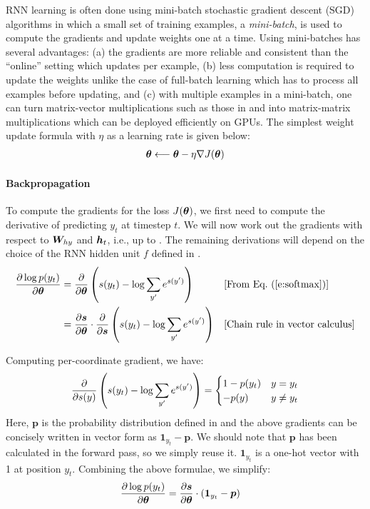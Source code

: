 RNN learning is often done using mini-batch stochastic gradient descent (SGD) algorithms in
which a small set of training examples, a {\it mini-batch}, is used to compute
the gradients and update weights one at a time. Using mini-batches has
several advantages: (a) the gradients are more reliable and consistent than the
``online'' setting which updates per example, (b) less computation is required to
update the weights unlike the case of full-batch learning which has to process
all examples before updating, and (c) with multiple examples in a mini-batch,
one can turn matrix-vector multiplications such
as those in  and  into matrix-matrix multiplications which can be
deployed efficiently on GPUs. The simplest weight update formula with $\eta$ as
a learning rate is given below:
\begin{align}
\thetav \longleftarrow \thetav - \eta \grad{J(\thetav)} %
\end{align}

\paragraph{Backpropagation} To compute the gradients for the loss $J(\bm{\theta})$,
we first need to compute the derivative of predicting $y_t$ at timestep $t$. We
will now work out the gradients with respect to $\bm{W}_{hy}$ and $\bm{h}_{t}$, i.e., up
to . The remaining derivations will depend on the choice of the RNN
hidden unit $f$ defined in .
\begin{align*}
\fracder{\log p(y_t)}{\thetav} &= \parfrac{\thetav} \paren{s(y_t) - \log \sum_{y'}
e^{s(y')}} && \text{[From \eq{e:softmax}]} \\
&= \fracder{\bm{s}}{\thetav} \cdot \parfrac{\bm{s}} \paren{s(y_t) - \log \sum_{y'}
e^{s(y')}} && \text{[Chain rule in vector calculus]} \\
\end{align*}

Computing per-coordinate gradient, we have:
\begin{align}
 \frac{\partial}{\partial s(y)} \left(s(y_t) - \log \sum_{y'} e^{s(y')}\right) =
  \begin{cases}
   1 - p(y_t) & y = y_t \\
   -p(y) & y \neq y_t
  \end{cases}
\end{align}
Here, $\bm{p}$ is the probability distribution defined in  and the
above gradients can be concisely written in vector form as $\bm{1}_{y_t} -
\bm{p}$. We should note that $\bm{p}$ has been calculated in the forward pass,
so we simply reuse it. $\bm{1}_{y_t}$ is a one-hot vector with 1 at position
$y_t$. Combining the above formulae, we simplify:
\begin{align}
\frac{\partial \log p(y_t)}{\partial \bm{\theta}} &= \frac{\partial \bm{s}}{\partial \bm{\theta}} \cdot (\bm{1}_{y_t}
- \bm{p})
\end{align}

